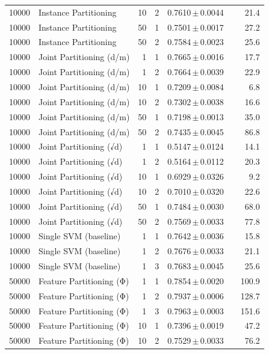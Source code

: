 \begin{table}[ht]
\begin{tabular}{rlrrccr}
10000 & Instance Partitioning & 10 & 2 & 0.7610\,$\pm$\,0.0044 &  & 21.4 \\
10000 & Instance Partitioning & 50 & 1 & 0.7501\,$\pm$\,0.0017 &  & 27.2 \\
10000 & Instance Partitioning & 50 & 2 & 0.7584\,$\pm$\,0.0023 &  & 25.6 \\
10000 & Joint Partitioning (d/m) & 1 & 1 & 0.7665\,$\pm$\,0.0016 &  & 17.7 \\
10000 & Joint Partitioning (d/m) & 1 & 2 & 0.7664\,$\pm$\,0.0039 &  & 22.9 \\
10000 & Joint Partitioning (d/m) & 10 & 1 & 0.7209\,$\pm$\,0.0084 &  & 6.8 \\
10000 & Joint Partitioning (d/m) & 10 & 2 & 0.7302\,$\pm$\,0.0038 &  & 16.6 \\
10000 & Joint Partitioning (d/m) & 50 & 1 & 0.7198\,$\pm$\,0.0013 &  & 35.0 \\
10000 & Joint Partitioning (d/m) & 50 & 2 & 0.7435\,$\pm$\,0.0045 &  & 86.8 \\
10000 & Joint Partitioning (√d) & 1 & 1 & 0.5147\,$\pm$\,0.0124 &  & 14.1 \\
10000 & Joint Partitioning (√d) & 1 & 2 & 0.5164\,$\pm$\,0.0112 &  & 20.3 \\
10000 & Joint Partitioning (√d) & 10 & 1 & 0.6929\,$\pm$\,0.0326 &  & 9.2 \\
10000 & Joint Partitioning (√d) & 10 & 2 & 0.7010\,$\pm$\,0.0320 &  & 22.6 \\
10000 & Joint Partitioning (√d) & 50 & 1 & 0.7484\,$\pm$\,0.0030 &  & 68.0 \\
10000 & Joint Partitioning (√d) & 50 & 2 & 0.7569\,$\pm$\,0.0033 &  & 77.8 \\
10000 & Single SVM (baseline) & 1 & 1 & 0.7642\,$\pm$\,0.0036 &  & 15.8 \\
10000 & Single SVM (baseline) & 1 & 2 & 0.7676\,$\pm$\,0.0033 &  & 21.1 \\
10000 & Single SVM (baseline) & 1 & 3 & 0.7683\,$\pm$\,0.0045 &  & 25.6 \\
50000 & Feature Partitioning (Φ) & 1 & 1 & 0.7854\,$\pm$\,0.0020 &  & 100.9 \\
50000 & Feature Partitioning (Φ) & 1 & 2 & 0.7937\,$\pm$\,0.0006 &  & 128.7 \\
50000 & Feature Partitioning (Φ) & 1 & 3 & 0.7963\,$\pm$\,0.0003 &  & 151.6 \\
50000 & Feature Partitioning (Φ) & 10 & 1 & 0.7396\,$\pm$\,0.0019 &  & 47.2 \\
50000 & Feature Partitioning (Φ) & 10 & 2 & 0.7529\,$\pm$\,0.0033 &  & 76.2 \\

\end{tabular}
\end{table}
